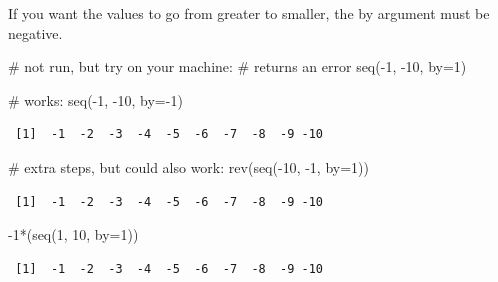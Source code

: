 \documentclass[
  13,
  letterpaper,
]{report}
\newenvironment{Shaded}{\begin{snugshade}}{\end{snugshade}}
\newcommand{\AttributeTok}[1]{\textcolor[rgb]{0.40,0.45,0.13}{#1}}
\newcommand{\CommentTok}[1]{\textcolor[rgb]{0.37,0.37,0.37}{#1}}
\newcommand{\DecValTok}[1]{\textcolor[rgb]{0.68,0.00,0.00}{#1}}
\newcommand{\FunctionTok}[1]{\textcolor[rgb]{0.28,0.35,0.67}{#1}}
\newcommand{\NormalTok}[1]{\textcolor[rgb]{0.00,0.23,0.31}{#1}}
\newcommand{\SpecialCharTok}[1]{\textcolor[rgb]{0.37,0.37,0.37}{#1}}
\begin{document}
If you want the values to go from greater to smaller, the by argument
must be negative.

\begin{Shaded}
\begin{Highlighting}[]
\CommentTok{\# not run, but try on your machine:}
\CommentTok{\# returns an error}
\FunctionTok{seq}\NormalTok{(}\SpecialCharTok{{-}}\DecValTok{1}\NormalTok{, }\SpecialCharTok{{-}}\DecValTok{10}\NormalTok{, }\AttributeTok{by=}\DecValTok{1}\NormalTok{)}
\end{Highlighting}
\end{Shaded}

\begin{Shaded}
\begin{Highlighting}[]
\CommentTok{\# works:}
\FunctionTok{seq}\NormalTok{(}\SpecialCharTok{{-}}\DecValTok{1}\NormalTok{, }\SpecialCharTok{{-}}\DecValTok{10}\NormalTok{, }\AttributeTok{by=}\SpecialCharTok{{-}}\DecValTok{1}\NormalTok{)}
\end{Highlighting}
\end{Shaded}

\begin{verbatim}
 [1]  -1  -2  -3  -4  -5  -6  -7  -8  -9 -10
\end{verbatim}

\begin{Shaded}
\begin{Highlighting}[]
\CommentTok{\# extra steps, but could also work:}
\FunctionTok{rev}\NormalTok{(}\FunctionTok{seq}\NormalTok{(}\SpecialCharTok{{-}}\DecValTok{10}\NormalTok{, }\SpecialCharTok{{-}}\DecValTok{1}\NormalTok{, }\AttributeTok{by=}\DecValTok{1}\NormalTok{))}
\end{Highlighting}
\end{Shaded}

\begin{verbatim}
 [1]  -1  -2  -3  -4  -5  -6  -7  -8  -9 -10
\end{verbatim}

\begin{Shaded}
\begin{Highlighting}[]
\SpecialCharTok{{-}}\DecValTok{1}\SpecialCharTok{*}\NormalTok{(}\FunctionTok{seq}\NormalTok{(}\DecValTok{1}\NormalTok{, }\DecValTok{10}\NormalTok{, }\AttributeTok{by=}\DecValTok{1}\NormalTok{))}
\end{Highlighting}
\end{Shaded}

\begin{verbatim}
 [1]  -1  -2  -3  -4  -5  -6  -7  -8  -9 -10
\end{verbatim}
\end{document}
